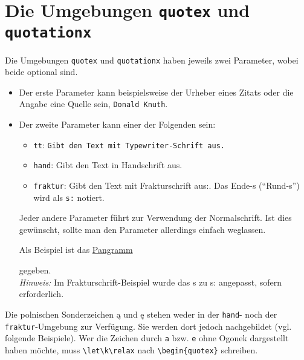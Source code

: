 
		\section{Die Umgebungen \texttt{quotex} und \texttt{quotationx}}
			\label{quotex_quotationx}

			Die Umgebungen \texttt{quotex} und \texttt{quotationx} haben jeweils zwei Parameter, wobei beide optional sind.
			\begin{itemize}
				\item Der erste Parameter kann beispielsweise der Urheber eines Zitats oder die Angabe eine Quelle sein, \zb \texttt{Donald Knuth}.
				\item Der zweite Parameter kann einer der Folgenden sein:
					\begin{itemize}
						\item \texttt{tt}: {\texttt{Gibt den Text mit Typewriter-Schrift aus.}}
						\item \texttt{hand}: {\oeschfamily Gibt den Text in Handschrift aus.}
						\item \texttt{fraktur}: {\frakfamily Gibt den Text mit Frakturschrift aus:.} Das Ende-s ("`Rund-s"') wird als \verb|s:| notiert.
					\end{itemize}
					Jeder andere Parameter führt zur Verwendung der Normalschrift. Ist dies gewünscht, sollte man den Parameter allerdings einfach weglassen.

					\newpage
					Als Beispiel ist das \href{https://de.wikipedia.org/wiki/Pangramm\#Liste_deutscher_Pangramme}{Pangramm}
					\begin{quote}
						\pangramm
					\end{quote}
					gegeben.\\
					\emph{Hinweis:} Im Frakturschrift-Beispiel wurde das {\frakfamily s} zu {\frakfamily s:} angepasst, sofern erforderlich.
			\end{itemize}

			\begin{redbox}
				Die polnischen Sonderzeichen \k a und \k e stehen weder in der \texttt{hand}- noch der \texttt{fraktur}-Umgebung zur Verfügung. Sie werden dort jedoch nachgebildet (vgl. folgende Beispiele). Wer die Zeichen durch \texttt{a} bzw. \texttt{e} ohne Ogonek dargestellt haben möchte, muss \verb|\let\k\relax| nach \texttt{\textbackslash begin\{quotex\}} schreiben.
			\end{redbox}

